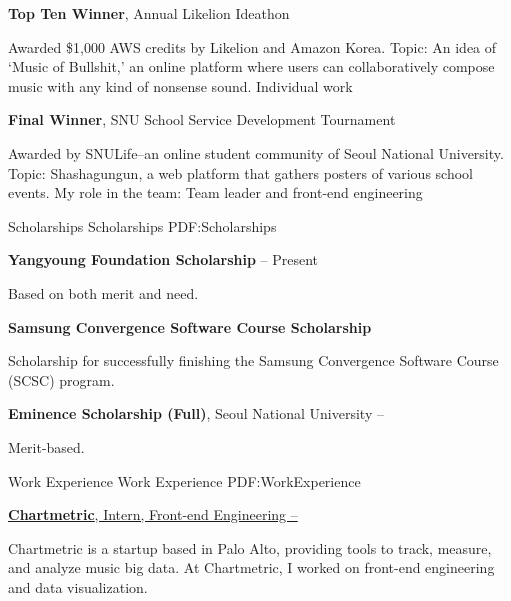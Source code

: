 \documentclass[letterpaper,MMMyyyy,nonstopmode]{template}
\begin{document}
\begin{Body}
\Gap
\Entry
\textbf{Top Ten Winner}, Annual Likelion Ideathon
\hfill
{}
\begin{Detail}
\SubBulletItem
Awarded \$1,000 AWS credits by Likelion and Amazon Korea.
\SubBulletItem
Topic: An idea of `Music of Bullshit,' an online platform where users can collaboratively compose music with any kind of nonsense sound.
\SubBulletItem
Individual work
\end{Detail}

\Gap
\Entry
\textbf{Final Winner}, SNU School Service Development Tournament
\hfill
{}
\begin{Detail}
\SubBulletItem
Awarded by SNULife--an online student community of Seoul National University.
\SubBulletItem
Topic: Shashagungun, a web platform that gathers posters of various school events.
\SubBulletItem
My role in the team: Team leader and front-end engineering
\end{Detail}

\Section
{Scholarships}
{Scholarships}
{PDF:Scholarships}

\BigGap
\Entry
\textbf{Yangyoung Foundation Scholarship}
\hfill
{} --
Present
\begin{Detail}
\SubBulletItem
Based on both merit and need.
\end{Detail}

\Gap
\Entry
\textbf{Samsung Convergence Software Course Scholarship}
\hfill
{}
\begin{Detail}
\SubBulletItem
Scholarship for successfully finishing the Samsung Convergence Software Course (SCSC) program.
\end{Detail}

\Gap
\Entry
\textbf{Eminence Scholarship (Full)},
Seoul National University
\hfill
{} --
\begin{Detail}
\SubBulletItem
Merit-based.
\end{Detail}


\Section
{Work Experience}
{Work Experience}
{PDF:WorkExperience}    

\BigGap
\Entry
  \href{https://chartmetric.io}
  {\textbf{Chartmetric}, Intern, Front-end Engineering
  \hfill
   --
  }
  \begin{Detail}
  \SubBulletItem
    Chartmetric is a startup based in Palo Alto, providing tools to track, measure, and analyze music big data. \newline At Chartmetric, I worked on front-end engineering and data visualization.
  \end{Detail}



\end{Body}
\end{document}
